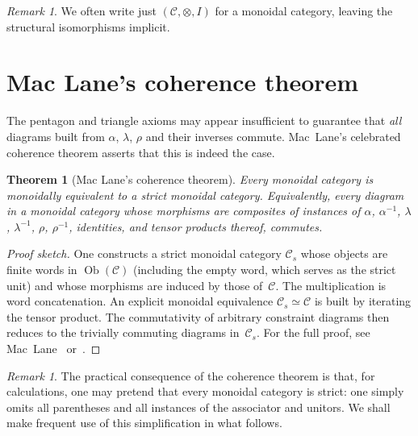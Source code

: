 \documentclass[a4paper,12pt]{book}
\DeclareMathOperator{\Ob}{Ob}
\theoremstyle{definition}
\theoremstyle{plain}
\newtheorem{theorem}[definition]{Theorem}
\theoremstyle{remark}
\newtheorem{remark}[definition]{Remark}
\begin{document}
\begin{remark}\label{rem:monoidal-functor-notation}
We often write just $(\mathcal{C}, \otimes, I)$ for a monoidal category,
leaving the structural isomorphisms implicit.
\end{remark}


\section{Mac Lane's coherence theorem}\label{sec:coherence}


The pentagon and triangle axioms may appear insufficient to guarantee that
\emph{all} diagrams built from $\alpha$, $\lambda$, $\rho$ and their
inverses commute.  Mac~Lane's celebrated coherence theorem asserts that
this is indeed the case.

\begin{theorem}[Mac Lane's coherence theorem]\label{thm:maclane-coherence}
Every monoidal category is monoidally equivalent to a strict monoidal
category.  Equivalently, every diagram in a monoidal category whose
morphisms are composites of instances of $\alpha$, $\alpha^{-1}$,
$\lambda$, $\lambda^{-1}$, $\rho$, $\rho^{-1}$, identities, and tensor
products thereof, commutes.
\end{theorem}

\begin{proof}[Proof sketch]
One constructs a strict monoidal category $\mathcal{C}_s$ whose objects
are finite words in $\Ob(\mathcal{C})$ (including the empty word, which
serves as the strict unit) and whose morphisms are induced by those
of~$\mathcal{C}$.  The multiplication is word concatenation.
An explicit monoidal equivalence $\mathcal{C}_s \simeq \mathcal{C}$ is
built by iterating the tensor product.  The commutativity of arbitrary
constraint diagrams then reduces to the trivially commuting diagrams
in~$\mathcal{C}_s$.  For the full proof, see Mac~Lane~\cite{MacLane1963}
or~\cite{MacLaneCWM}.
\end{proof}

\begin{remark}\label{rem:coherence-practical}
The practical consequence of the coherence theorem is that, for
calculations, one may pretend that every monoidal category is strict:
one simply omits all parentheses and all instances of the
associator and unitors.  We shall make frequent use of this
simplification in what follows.
\end{remark}
\end{document}

